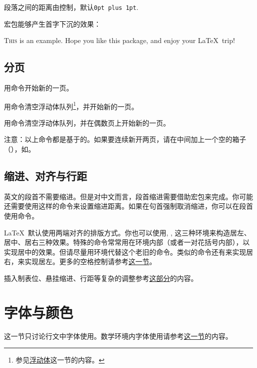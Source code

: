 段落之间的距离由控制，默认\texttt{0pt plus 1pt}. 
\begin{latex}
\setlength{\parskip}{0pt}
\end{latex}

宏包能够产生首字下沉的效果：
\begin{codeshow}
\lettrine{T}{his} is an example. Hope you like this package, and enjoy your \LaTeX\ trip!
\end{codeshow}

\subsection{分页}
用命令开始新的一页。

用命令清空浮动体队列\footnote{参见\hyperref[sec:float]{浮动体}这一节的内容。}，并开始新的一页。

用命令清空浮动体队列，并在偶数页上开始新的一页。

注意：以上命令都是基于的。如果要连续新开两页，请在中间加上一个空的箱子（），如。

\subsection{缩进、对齐与行距}
英文的段首不需要缩进。但是对中文而言，段首缩进需要借助宏包来完成。你可能还需要使用这样的命令来设置缩进距离。如果在句首强制取消缩进，你可以在段首使用命令。

\LaTeX\ 默认使用两端对齐的排版方式。你也可以使用, , 这三种环境来构造居左、居中、居右三种效果。特殊的命令常常用在环境内部（或者一对花括号内部），以实现居中的效果。但请尽量用环境代替这个老旧的命令。类似的命令还有来实现居右，来实现居左。更多的空格控制请参考\hyperref[sec:hvspace]{这一节}。

插入制表位、悬挂缩进、行距等复杂的调整参考\hyperref[sec:hvspace]{这部分}的内容。

\section{字体与颜色}
\label{sec:font}
这一节只讨论行文中字体使用。数学环境内字体使用请参考\hyperref[sec:mathfont]{这一节}的内容。


